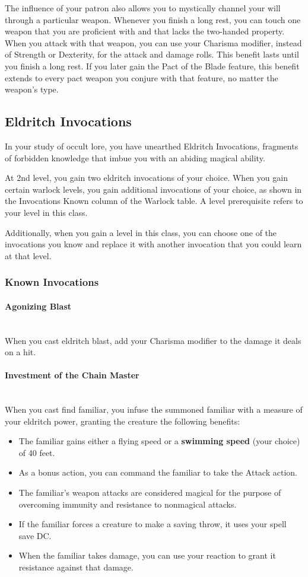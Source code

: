 {The influence of your patron also allows you to mystically channel your will through a particular weapon. Whenever you finish a long rest, you can touch one weapon that you are proficient with and that lacks the two-handed property. When you attack with that weapon, you can use your Charisma modifier, instead of Strength or Dexterity, for the attack and damage rolls. This benefit lasts until you finish a long rest. If you later gain the Pact of the Blade feature, this benefit extends to every pact weapon you conjure with that feature, no matter the weapon's type.

\subsection*{Eldritch Invocations}
In your study of occult lore, you have unearthed Eldritch Invocations, fragments of forbidden knowledge that imbue you with an abiding magical ability.

At 2nd level, you gain two eldritch invocations of your choice. When you gain certain warlock levels, you gain additional invocations of your choice, as shown in the Invocations Known column of the Warlock table. A level prerequisite refers to your level in this class.

Additionally, when you gain a level in this class, you can choose one of the invocations you know and replace it with another invocation that you could learn at that level.
\subsubsection*{Known Invocations}
\paragraph*{Agonizing Blast}\hfill\\
When you cast eldritch blast, add your Charisma modifier to the damage it deals on a hit.\\
\paragraph*{Investment of the Chain Master}\hfill\\
When you cast find familiar, you infuse the summoned familiar with a measure of your eldritch power, granting the creature the following benefits:
\begin{itemize}
	\item The familiar gains either a flying speed or a \textbf{swimming speed} (your choice) of 40 feet.
	\item As a bonus action, you can command the familiar to take the Attack action.
	\item The familiar's weapon attacks are considered magical for the purpose of overcoming immunity and resistance to nonmagical attacks.
	\item If the familiar forces a creature to make a saving throw, it uses your spell save DC.
	\item When the familiar takes damage, you can use your reaction to grant it resistance against that damage.
\end{itemize}\hfill\\
}
